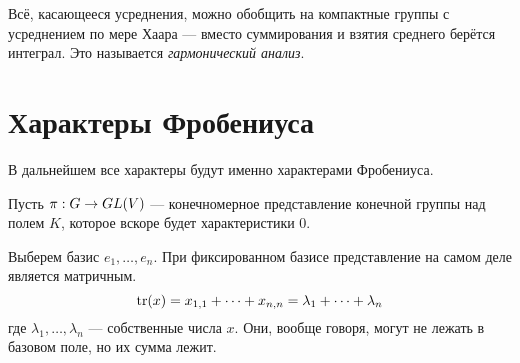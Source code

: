 Всё, касающееся усреднения, можно обобщить на компактные группы с усреднением по мере Хаара --- вместо суммирования и взятия среднего берётся интеграл.
Это называется \textit{гармонический анализ}.


\section{Характеры Фробениуса}
В дальнейшем все характеры будут именно характерами Фробениуса.

Пусть $\pi: G \rightarrow GL(V)$ --- конечномерное представление конечной группы над полем $K$, которое вскоре будет характеристики 0.

Выберем базис $e_1, \dots, e_n$.
При фиксированном базисе представление на самом деле является матричным.
\[\operatorname{tr}(x) = x_{1,1} + \dots + x_{n,n} = \lambda_1 + \dots + \lambda_n\]
где $\lambda_1, \dots, \lambda_n$ --- собственные числа $x$.
Они, вообще говоря, могут не лежать в базовом поле, но их сумма лежит.


